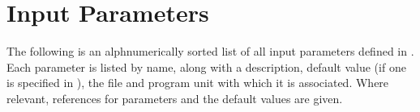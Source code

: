 \chapter{Input Parameters}

The following is an alphnumerically sorted list of all input parameters defined in \glc. Each parameter is listed by name, along with a description, default value (if one is specified in \glc), the file and program unit with which it is associated. Where relevant, references for parameters and the default values are given.\\





